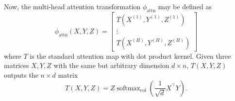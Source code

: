 \documentclass{article}
\DeclareMathOperator{\softmax}{softmax}
\begin{document}
Now, the multi-head attention transformation $\phi_\text{attn}$ may be defined as
\begin{equation*}
  \phi_\text{attn}(X, Y, Z) = \begin{bmatrix} T(X^{(1)}, Y^{(1)}, Z^{(1)})
    \\\vdots\\ T(X^{(H)}, Y^{(H)}, Z^{(H)})\end{bmatrix}
\end{equation*}
where $T$ is the standard attention map with dot product kernel. Given
three matrices $X, Y, Z$ with the same but arbitrary dimension $d\times n$,
$T(X, Y, Z)$ outputs the $n\times d$ matrix
\begin{equation*}
  T(X, Y, Z) = Z\softmax_\text{col}\left(\frac1{\sqrt d} X^\top Y\right).
\end{equation*}
\end{document}
